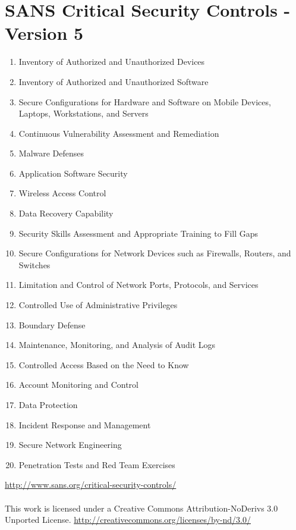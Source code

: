 \section{SANS Critical Security Controls - Version 5}
\begin{enumerate}
\item Inventory of Authorized and Unauthorized Devices
\item Inventory of Authorized and Unauthorized Software
\item Secure Configurations for Hardware and Software on Mobile Devices, Laptops, Workstations, and Servers
\item Continuous Vulnerability Assessment and Remediation
\item Malware Defenses
\item Application Software Security
\item Wireless Access Control
\item Data Recovery Capability
\item Security Skills Assessment and Appropriate Training to Fill Gaps
\item Secure Configurations for Network Devices such as Firewalls, Routers, and Switches
\item Limitation and Control of Network Ports, Protocols, and Services
\item Controlled Use of Administrative Privileges
\item Boundary Defense
\item Maintenance, Monitoring, and Analysis of Audit Logs
\item Controlled Access Based on the Need to Know
\item Account Monitoring and Control
\item Data Protection
\item Incident Response and Management
\item Secure Network Engineering
\item Penetration Tests and Red Team Exercises
\end{enumerate}
\url{http://www.sans.org/critical-security-controls/}\\\\This work is licensed under a Creative Commons Attribution-NoDerivs 3.0 Unported License. \url{http://creativecommons.org/licenses/by-nd/3.0/}
